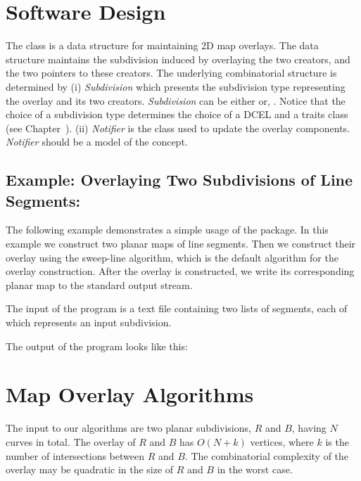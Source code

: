 \begin{ccTexOnly}

\section{Software Design}
The  class 
is a data structure for maintaining 2D map overlays.
The data structure maintains the subdivision induced by overlaying 
the two creators, and the two pointers to these creators. 
The underlying combinatorial structure is determined by
(i) {\it Subdivision} which presents the subdivision type 
representing the overlay and its two creators. 
{\it Subdivision} can be either  or, 
 .
Notice that the choice of a subdivision type determines the choice 
of a DCEL and a traits class (see Chapter~).
(ii) {\it Notifier} is the class used to update the overlay components. 
{\it Notifier} should be a model of the 
 concept.

\subsection*{Example: Overlaying Two Subdivisions of Line Segments:}
The following example demonstrates a simple usage of the 
 package.
In this example we construct two planar maps of line segments. 
Then we construct their overlay using the sweep-line algorithm, which is 
the default algorithm for the overlay construction. 
After the overlay is constructed, we write its corresponding planar map to the 
standard output stream. 

The input of the program is a text file containing two lists of segments, 
each of which represents an input subdivision.

The output of the program looks like this:

\section{Map Overlay Algorithms}
\label{sec:algorithms}
The input to our algorithms are two planar subdivisions, 
$R$ and $B$, having $N$ curves in total. 
The overlay of $R$ and $B$ has $O(N+k)$ vertices, 
where $k$ is the number of intersections between $R$ and $B$.
The combinatorial complexity of the overlay may be quadratic 
in the size of $R$ and $B$ in the worst case.


\end{ccTexOnly}
